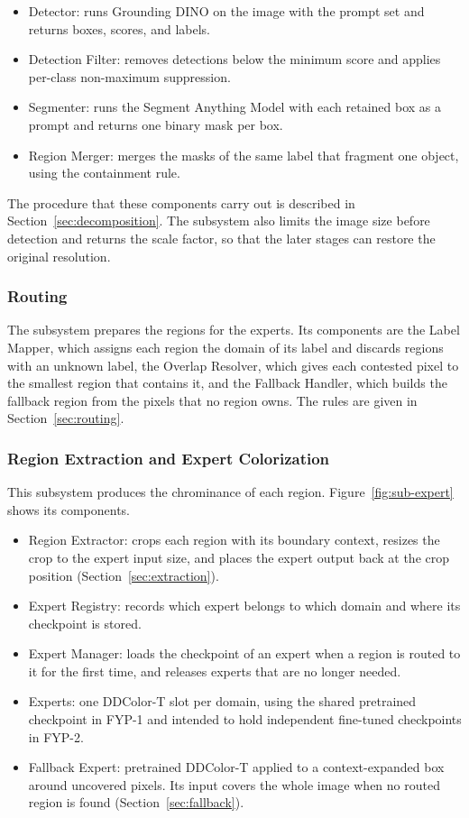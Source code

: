 \documentclass{FastFyp}
\begin{document}
\begin{itemize}
    \item Detector: runs Grounding DINO on the image with the prompt set and returns boxes, scores, and labels.
    \item Detection Filter: removes detections below the minimum score and applies per-class non-maximum suppression.
    \item Segmenter: runs the Segment Anything Model with each retained box as a prompt and returns one binary mask per box.
    \item Region Merger: merges the masks of the same label that fragment one object, using the containment rule.
\end{itemize}

The procedure that these components carry out is described in Section~\ref{sec:decomposition}. The subsystem also limits the image size before detection and returns the scale factor, so that the later stages can restore the original resolution.

\subsubsection{Routing}

The subsystem prepares the regions for the experts. Its components are the Label Mapper, which assigns each region the domain of its label and discards regions with an unknown label, the Overlap Resolver, which gives each contested pixel to the smallest region that contains it, and the Fallback Handler, which builds the fallback region from the pixels that no region owns. The rules are given in Section~\ref{sec:routing}.

\subsubsection{Region Extraction and Expert Colorization}

This subsystem produces the chrominance of each region. Figure~\ref{fig:sub-expert} shows its components.

\begin{itemize}
    \item Region Extractor: crops each region with its boundary context, resizes the crop to the expert input size, and places the expert output back at the crop position (Section~\ref{sec:extraction}).
    \item Expert Registry: records which expert belongs to which domain and where its checkpoint is stored.
    \item Expert Manager: loads the checkpoint of an expert when a region is routed to it for the first time, and releases experts that are no longer needed.
    \item Experts: one DDColor-T slot per domain, using the shared pretrained checkpoint in FYP-1 and intended to hold independent fine-tuned checkpoints in FYP-2.
    \item Fallback Expert: pretrained DDColor-T applied to a context-expanded box around uncovered pixels. Its input covers the whole image when no routed region is found (Section~\ref{sec:fallback}).
\end{itemize}
\end{document}
